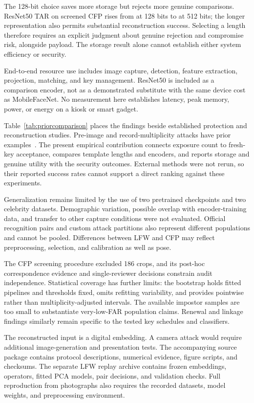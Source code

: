 The 128-bit choice saves more storage but rejects more genuine comparisons. ResNet50 TAR on screened CFP rises from \RnetSmallTar{} at 128 bits to \RnetLargeTar{} at 512 bits; the longer representation also permits substantial reconstruction success. Selecting a length therefore requires an explicit judgment about genuine rejection and compromise risk, alongside payload. The storage result alone cannot establish either system efficiency or security.

End-to-end resource use includes image capture, detection, feature extraction, projection, matching, and key management. ResNet50 is included as a comparison encoder, not as a demonstrated substitute with the same device cost as MobileFaceNet. No measurement here establishes latency, peak memory, power, or energy on a kiosk or smart gadget.


Table~\ref{tab:priorcomparison} places the findings beside established protection and reconstruction studies. Pre-image and record-multiplicity attacks have prior examples~\cite{wang2021csa,li2014multiplicity}. The present empirical contribution connects exposure count to fresh-key acceptance, compares template lengths and encoders, and reports storage and genuine utility with the security outcomes. External methods were not rerun, so their reported success rates cannot support a direct ranking against these experiments.


Generalization remains limited by the use of two pretrained checkpoints and two celebrity datasets. Demographic variation, possible overlap with encoder-training data, and transfer to other capture conditions were not evaluated. Official recognition pairs and custom attack partitions also represent different populations and cannot be pooled. Differences between LFW and CFP may reflect preprocessing, selection, and calibration as well as pose.

The CFP screening procedure excluded 186 crops, and its post-hoc correspondence evidence and single-reviewer decisions constrain audit independence. Statistical coverage has further limits: the bootstrap holds fitted pipelines and thresholds fixed, omits refitting variability, and provides pointwise rather than multiplicity-adjusted intervals. The available impostor samples are too small to substantiate very-low-FAR population claims. Renewal and linkage findings similarly remain specific to the tested key schedules and classifiers.

The reconstructed input is a digital embedding. A camera attack would require additional image-generation and presentation tests. The accompanying source package contains protocol descriptions, numerical evidence, figure scripts, and checksums. The separate LFW replay archive contains frozen embeddings, operators, fitted PCA models, pair decisions, and validation checks. Full reproduction from photographs also requires the recorded datasets, model weights, and preprocessing environment.
